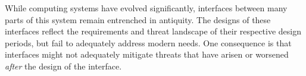 While computing systems have evolved significantly, interfaces between many 
parts of this system remain entrenched in antiquity.
The designs of these interfaces reflect the requirements and threat landscape
of their respective design periods, but fail to adequately address modern
needs.
One consequence is that interfaces might not adequately mitigate threats
that have arisen or worsened \emph{after} the design of the interface.
